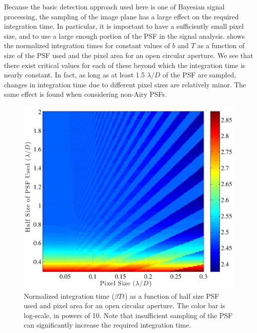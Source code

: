Because the basic detection approach used here is one of Bayesian signal processing, the sampling of the image plane has a large effect on the required integration time.  In particular, it is important to have a sufficiently small pixel size, and to use a large enough portion of the PSF in the signal analysis.  shows the normalized integration times for constant values of $b$ and $T$ as a function of size of the PSF used and the pixel area for an open circular aperture.  We see that there exist critical values for each of these beyond which the integration time is nearly constant.  In fact, as long as at least 1.5 $\lambda/D$ of the PSF are sampled, changes in integration time due to different pixel sizes are relatively minor.  The same effect is found when considering non-Airy PSFs.
\begin{figure}[ht]
 \center
 \includegraphics[width=5in]{./figures/intTimevPSF}
  \caption[Integration time vs.~PSF sampling ]{ \label{fig:intTimevPSF} Normalized integration time ($\beta T t$) as a function of half size PSF used and pixel area for an open circular aperture.  The color bar is log-scale, in powers of 10.  Note that insufficient sampling of the PSF can significantly increase the required integration time.}
\end{figure} 

